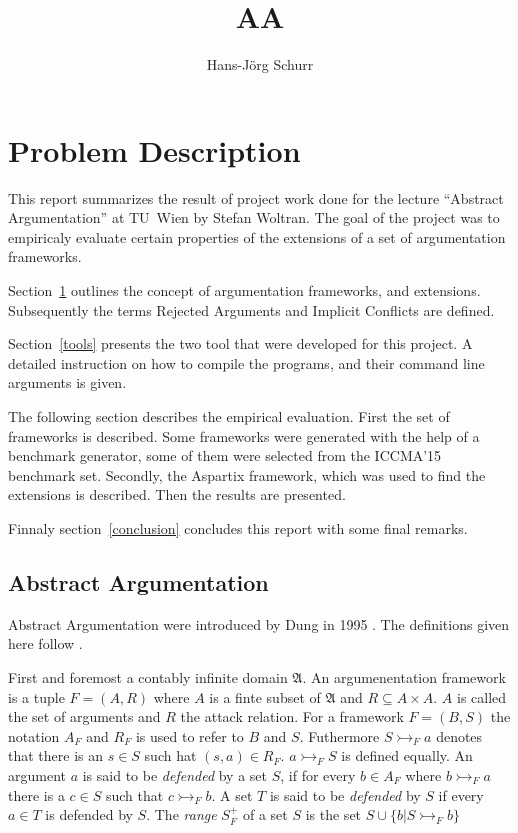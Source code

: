 \documentclass{scrartcl}
\title{AA}
\author{Hans-Jörg Schurr}
\begin{document}
\maketitle
\tableofcontents

\section{Problem Description}
\label{problemdesc}
This report summarizes the result of project work done for the lecture ``Abstract Argumentation'' at TU~Wien by
Stefan Woltran. The goal of the project was to empiricaly evaluate certain properties of the extensions of a set
of argumentation frameworks.

Section~\ref{problemdesc} outlines the concept of argumentation frameworks, and
extensions. Subsequently the terms Rejected Arguments and Implicit Conflicts
are defined.

Section~\ref{tools} presents the two tool that were developed for this project.
A detailed instruction on how to compile the programs, and their command line
arguments is given.

The following section describes the empirical evaluation. First the set of
frameworks is described.  Some frameworks were generated with the help of a
benchmark generator, some of them were selected from the ICCMA'15 benchmark
set. Secondly, the Aspartix framework, which was used to find the extensions
is described. Then the results are presented.

Finnaly section~\ref{conclusion} concludes this report with some final remarks.

\subsection{Abstract Argumentation}

Abstract Argumentation were introduced by Dung in 1995 \cite{dung1995}. The definitions given
here follow \cite{linsbichler2015hidden}.

First and foremost a contably infinite domain $\mathfrak{A}$. An
argumenentation framework is a tuple $F = (A,R)$ where $A$ is a finte subset of
$\mathfrak{A}$ and $R \subseteq A\times A$.  $A$ is called the set of arguments
and $R$ the attack relation. For a framework $F = (B, S)$ the notation $A_F$
and $R_F$ is used to refer to $B$ and $S$. Futhermore $S \rightarrowtail_F a$
denotes that there is an $s \in S$ such hat $(s, a) \in R_F$. $a
\rightarrowtail_F S$ is defined equally. An argument $a$ is said to be
\emph{defended} by a set $S$, if for every $b \in A_F$ where $b \rightarrowtail_F a$
there is a $c \in S$ such that $c \rightarrowtail_F b$. A set $T$ is said to be \emph{defended}
by $S$ if every $a \in T$ is defended by $S$. The \emph{range} $S_F^{+}$ of a
set $S$ is the set $S \cup\{b | S \rightarrowtail_F b\}$
\end{document}
